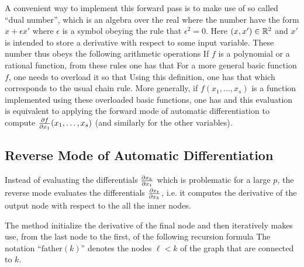 A convenient way to implement this forward pass is to make use of so called ``dual number'', which is an algebra over the real  where the number have the form $x + \epsilon x'$ where $\epsilon$ is a symbol obeying the rule that $\epsilon^2=0$. Here $(x,x') \in \mathbb{R}^2$ and $x'$ is intended to store a derivative with respect to some input variable. These number thus obeys the following arithmetic operations
If $f$ is a polynomial or a rational function, from these rules one has that 
For a more general basic function $f$, one needs to overload it so that
Using this definition, one has that 
which corresponds to the usual chain rule. More generally, if $f(x_1,\ldots,x_s)$ is a function implemented using these overloaded basic functions, one has  
and this evaluation is equivalent to applying the forward mode of automatic differentiation to compute $\frac{ \partial f}{\partial x_1}(x_1,\ldots,x_s)$ (and similarly for the other variables).


\subsection{Reverse Mode of Automatic Differentiation}

Instead of evaluating the differentials $\frac{ \partial x_k}{\partial x_1}$ which is problematic for a large $p$, the reverse mode evaluates the differentials  $\frac{ \partial x_t}{\partial x_k}$, i.e. it computes the derivative of the output node with respect to the all the inner nodes. 

The method initialize the derivative of the final node
and then iteratively makes use,  from the last node to the first, of the following recursion formula
%
The notation ``$\text{father}(k)$'' denotes the nodes $\ell<k$ of the graph that are connected to $k$.

